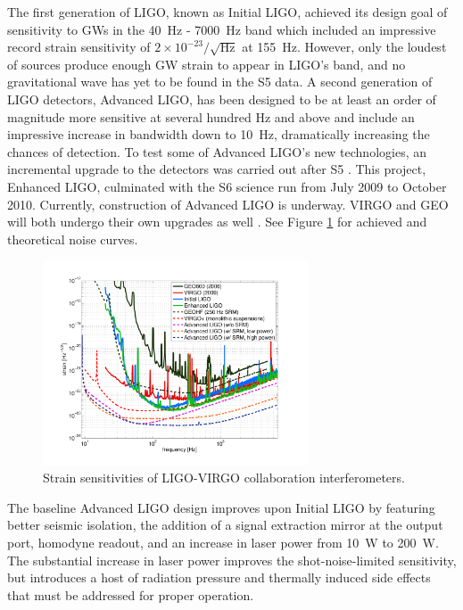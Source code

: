 The first generation of LIGO, known as Initial LIGO, achieved its
design goal of sensitivity to GWs in the 40~Hz - 7000~Hz band which
included an impressive record strain sensitivity of
$2\times10^{-23}/\sqrt{\mathrm{Hz}}$ at 155~Hz. However, only the
loudest of sources produce enough GW strain to appear in LIGO's band,
and no gravitational wave has yet to be found in the S5 data. A second
generation of LIGO detectors, Advanced LIGO, has been designed to be
at least an order of magnitude more sensitive at several hundred Hz
and above and include an impressive increase in bandwidth down to
10~Hz, dramatically increasing the chances of detection. To test some
of Advanced LIGO's new technologies, an incremental upgrade to the
detectors was carried out after S5 \cite{Adhikari2006Enhanced}. This
project, Enhanced LIGO, culminated with the S6 science run from July
2009 to October 2010. Currently, construction of Advanced LIGO is
underway. VIRGO and GEO will both undergo their own upgrades as well
\cite{Acernese2008Virgo} \cite{Luck2010Upgrade}. See Figure
\ref{fig:h_all} for achieved and theoretical noise curves.

\begin{figure}
\begin{centering}
\includegraphics[width=0.7\textwidth]{figures/GWnetwork_sensitivities.pdf}
\caption{Strain sensitivities of LIGO-VIRGO collaboration interferometers.}
\label{fig:h_all}
\end{centering}
\end{figure}

The baseline Advanced LIGO design \cite{AdvLigoSysDesign} improves
upon Initial LIGO by featuring better seismic isolation, the addition
of a signal extraction mirror at the output port, homodyne readout,
and an increase in laser power from 10~W to 200~W. The substantial
increase in laser power improves the shot-noise-limited sensitivity,
but introduces a host of radiation pressure and thermally induced side
effects that must be addressed for proper operation.

